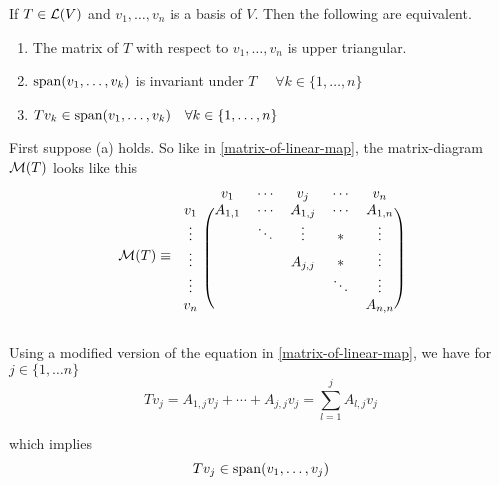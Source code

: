 \setcounter{thm}{38}
\begin{thm} 
  \label{conditions for upper-triangular matrix}
  If $T \in \mathcal{L} (V)$ and $v_1, \dots, v_n$ is a basis of $V$. Then the following are equivalent.
  \begin{enumerate}[label=(\alph*)]
    \item The matrix of $T$ with respect to $v_1, \dots, v_n$ is upper triangular.
    \item $\operatorname{span} (v_1, \dots, v_k)$ is invariant under $T$ $\quad \forall k \in \{ 1, \dots, n\}$
    \item $T v_k \in \operatorname{span} (v_1, \dots, v_k) \quad \forall k \in \{1, \dots, n\}$
  \end{enumerate}
\end{thm}
\begin{prf}
  First suppose (a) holds. So like in \ref{matrix-of-linear-map}, the matrix-diagram $\mathcal{M}(T)$ looks like this
  \begin{equation}
  \mathcal{M} (T) \equiv
  \begin{blockarray}{cccccc}
             & v_1     & \cdots & v_j      & \cdots & v_n     \\
    \begin{block}{c(ccccc)}
      v_1    & A_{1,1} & \cdots & A_{1,j}  & \cdots & A_{1,n} \\
      \vdots &         & \ddots & \vdots   &   *    & \vdots  \\
      \vdots &         &        & A_{j,j}  &   *    & \vdots  \\
      \vdots &         &        &          & \ddots & \vdots  \\
      v_n    &         &        &          &        & A_{n,n} \\
    \end{block}
  \end{blockarray}
  \end{equation}
  
  Using a modified version of the equation in \ref{matrix-of-linear-map}, we have for $j\in \{1, \ldots n \}$
  \begin{equation}
    T v_j = A_{1,j} v_j + \cdots + A_{j,j} v_j = \sum_{l=1}^{j} A_{l,j} v_j
  \end{equation}
  
  which implies
  \begin{equation}
    T v_j \in \operatorname{span} (v_1, \ldots, v_j)
  \end{equation}
  

\end{prf}
